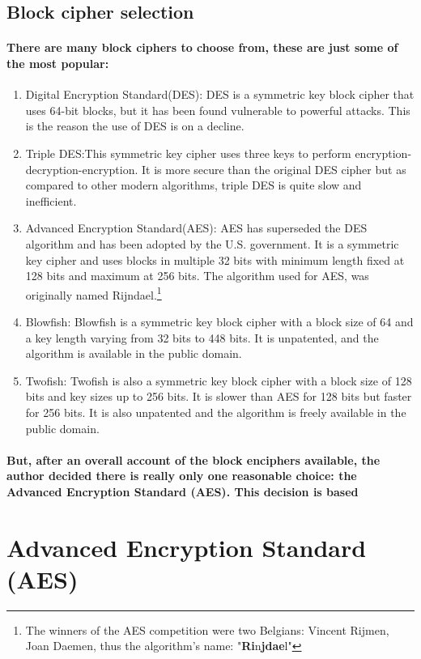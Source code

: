 \subsection{Block cipher selection}
\paragraph{There are many block ciphers to choose from, these are just some of the most popular:}\cite{book3}
\begin{enumerate}
\item Digital Encryption Standard(DES): DES is a symmetric key block cipher that uses 64-bit blocks, but it has been found vulnerable to powerful attacks. This is the reason the use of DES is on a decline. 
\item Triple DES:This symmetric key cipher uses three keys to perform encryption-decryption-encryption. It is more secure than the original DES cipher but as compared to other modern algorithms, triple DES is quite slow and inefficient. 
\item Advanced Encryption Standard(AES): AES has superseded the DES algorithm and has been adopted by the U.S. government. It is a symmetric key cipher and uses blocks in multiple 32 bits with minimum length fixed at 128 bits and maximum at 256 bits. The algorithm used for AES, was originally named Rijndael.\footnote{The winners of the AES competition were two Belgians: Vincent Rijmen, Joan Daemen, thus the algorithm's name: "\textbf{Ri}n\textbf{jdae}l"}
\item Blowfish: Blowfish is a symmetric key block cipher with a block size of 64 and a key length varying from 32 bits to 448 bits. It is unpatented, and the algorithm is available in the public domain. 
\item Twofish: Twofish is also a symmetric key block cipher with a block size of 128 bits and key sizes up to 256 bits. It is slower than AES for 128 bits but faster for 256 bits. It is also unpatented and the algorithm is freely available in the public domain.
\end{enumerate}

\paragraph{But, after an overall account of the block enciphers available, the author decided there is really only one reasonable choice: the Advanced Encryption Standard (AES). This decision is based }

\section{Advanced Encryption Standard (AES)}

